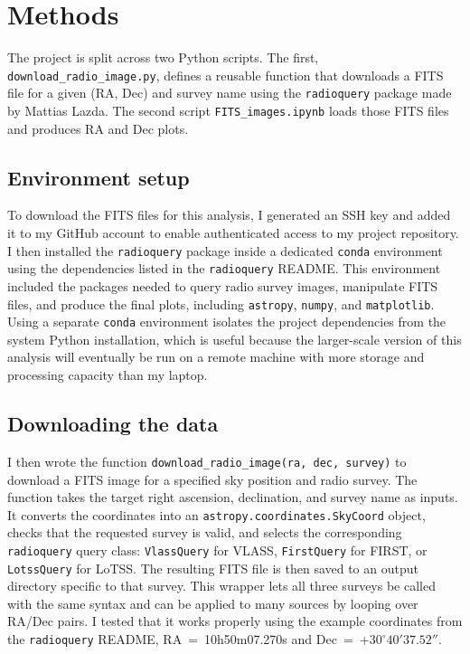 \documentclass[11pt]{article}
\begin{document}
\section{Methods}
\label{sec:methods}

The project is split across two Python scripts. The first, \texttt{download\_radio\_image.py}, defines a reusable function that downloads a FITS file for a given (RA, Dec) and survey name using the \texttt{radioquery} package made by Mattias Lazda. The second script \texttt{FITS\_images.ipynb} loads those FITS files and produces RA and Dec plots.

\subsection{Environment setup}

To download the FITS files for this analysis, I generated an SSH key and added it to my GitHub account to enable authenticated access to my project repository. I then installed the \texttt{radioquery} package inside a dedicated \texttt{conda} environment using the dependencies listed in the \texttt{radioquery} README. This environment included the packages needed to query radio survey images, manipulate FITS files, and produce the final plots, including \texttt{astropy}, \texttt{numpy}, and \texttt{matplotlib}. Using a separate \texttt{conda} environment isolates the project dependencies from the system Python installation, which is useful because the larger-scale version of this analysis will eventually be run on a remote machine with more storage and processing capacity than my laptop.

\subsection{Downloading the data}

I then wrote the function \texttt{download\_radio\_image(ra, dec, survey)} to download a FITS image for a specified sky position and radio survey. The function takes the target right ascension, declination, and survey name as inputs. It converts the coordinates into an
\texttt{astropy.coordinates.SkyCoord} object, checks that the requested survey is valid, and selects the corresponding \texttt{radioquery} query
class: \texttt{VlassQuery} for VLASS, \texttt{FirstQuery} for FIRST, or \texttt{LotssQuery} for LoTSS. The resulting FITS file is then saved to an output directory specific to that survey. This wrapper lets all three surveys be called with the same syntax and can be applied to many sources by looping over RA/Dec pairs. I tested that it works properly using the example coordinates from the \texttt{radioquery} README, RA~=~10h50m07.270s and Dec~=~$+30^\circ40'37.52''$.
\end{document}
